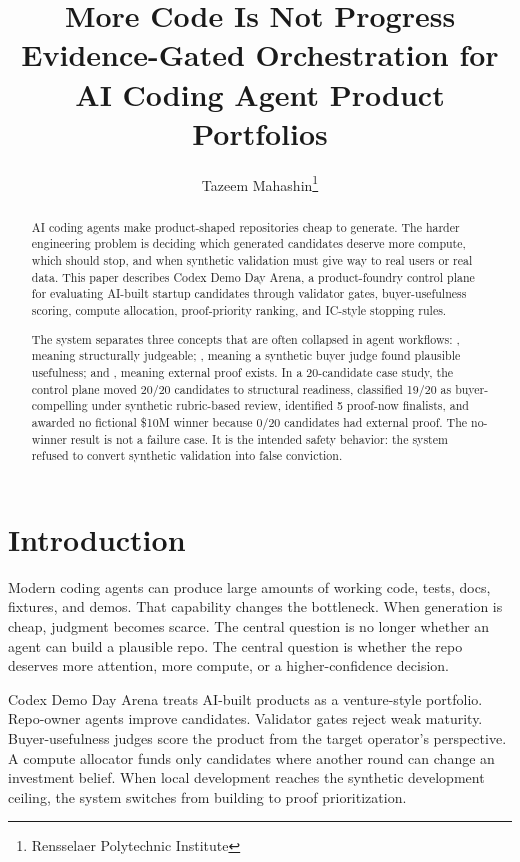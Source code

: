 \documentclass[11pt]{article}
\title{\textbf{More Code Is Not Progress}\\[0.65em]
\large Evidence-Gated Orchestration for AI Coding Agent Product Portfolios}
\author{Tazeem Mahashin\thanks{Rensselaer Polytechnic Institute}}
\date{}
\newcommand{\code}[1]{\texttt{\seqsplit{#1}}}
\newcommand{\ready}{\code{ready}}
\newcommand{\compelling}{\code{compelling}}
\newcommand{\investable}{\code{investable}}
\newcommand{\repo}{Codex Demo Day Arena}
\begin{document}
\maketitle

\begin{abstract}
AI coding agents make product-shaped repositories cheap to generate. The harder engineering problem is deciding which generated candidates deserve more compute, which should stop, and when synthetic validation must give way to real users or real data. This paper describes \repo, a product-foundry control plane for evaluating AI-built startup candidates through validator gates, buyer-usefulness scoring, compute allocation, proof-priority ranking, and IC-style stopping rules.

The system separates three concepts that are often collapsed in agent workflows: \ready, meaning structurally judgeable; \compelling, meaning a synthetic buyer judge found plausible usefulness; and \investable, meaning external proof exists. In a 20-candidate case study, the control plane moved 20/20 candidates to structural readiness, classified 19/20 as buyer-compelling under synthetic rubric-based review, identified 5 proof-now finalists, and awarded no fictional \$10M winner because 0/20 candidates had external proof. The no-winner result is not a failure case. It is the intended safety behavior: the system refused to convert synthetic validation into false conviction.
\end{abstract}

\section{Introduction}

Modern coding agents can produce large amounts of working code, tests, docs, fixtures, and demos. That capability changes the bottleneck. When generation is cheap, judgment becomes scarce. The central question is no longer whether an agent can build a plausible repo. The central question is whether the repo deserves more attention, more compute, or a higher-confidence decision.

\repo{} treats AI-built products as a venture-style portfolio. Repo-owner agents improve candidates. Validator gates reject weak maturity. Buyer-usefulness judges score the product from the target operator's perspective. A compute allocator funds only candidates where another round can change an investment belief. When local development reaches the synthetic development ceiling, the system switches from building to proof prioritization.
\end{document}
